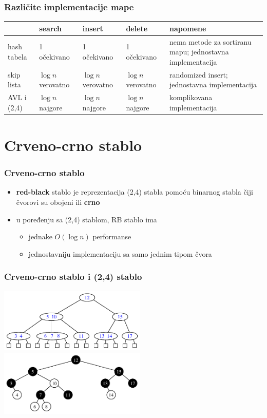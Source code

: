 \documentclass[compress]{beamer}
\begin{document}
\begin{frame}[fragile]
  \frametitle{Različite implementacije mape}
  \begin{tabular}{p{2cm}|p{1cm}|p{1cm}|p{1cm}|p{4cm}}
  & \textbf{search} & \textbf{insert} & \textbf{delete} & \textbf{napomene} \\ \hline\hline
  hash tabela & 1 \mbox{\tiny očekivano} & 1 \mbox{\tiny očekivano} & 1 \mbox{\tiny očekivano} & {\scriptsize nema metode za sortiranu mapu; jednostavna implementacija} \\ \hline
  skip lista & $\log n$ \mbox{\tiny verovatno} & $\log n$ \mbox{\tiny verovatno} & $\log n$ \mbox{\tiny verovatno} & {\scriptsize randomized insert; jednostavna implementacija} \\ \hline
  AVL i (2,4) & $\log n$ \mbox{\tiny najgore} & $\log n$ \mbox{\tiny najgore} & $\log n$ \mbox{\tiny najgore} & {\scriptsize komplikovana implementacija} \\ \hline
  \end{tabular}
\end{frame}

\section[RB stablo]{Crveno-crno stablo}
\begin{frame}[fragile]
  \frametitle{Crveno-crno stablo}
  \begin{itemize}
    \item \textbf{red-black} stablo je reprezentacija (2,4) stabla pomoću binarnog stabla čiji čvorovi su obojeni  ili \textbf{crno}
    \item u poređenju sa (2,4) stablom, RB stablo ima
    \begin{itemize}
      \item jednake $O(\log n)$ performanse
      \item jednostavniju implementaciju sa samo jednim tipom čvora
    \end{itemize}
  \end{itemize}
\end{frame}

\begin{frame}[fragile]
  \frametitle{Crveno-crno stablo i (2,4) stablo}
  \begin{center}
    \includegraphics[width=7cm]{asp-11-pic30.pdf} \\
    \includegraphics[width=7cm]{asp-11-pic38.pdf}
  \end{center}
\end{frame}
\end{document}
